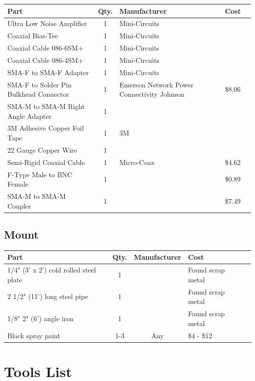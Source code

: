 \documentclass[11pt]{article} %
\begin{document}
\begin{tabular}{| p{6cm} | c | p{5cm} | l | c |}
\hline
\textbf{Part} & \textbf{Qty.} & \textbf{Manufacturer} & \textbf{Cost} \\ \hline \hline
Ultra Low Noise Amplifier & 1 & Mini-Circuits & \\ \hline
Coaxial Bias-Tee & 1 & Mini-Circuits & \\ \hline
Coaxial Cable 086-6SM+ & 1 & Mini-Circuits & \\ \hline
Coaxial Cable 086-4SM+ & 1 & Mini-Circuits & \\ \hline
SMA-F to SMA-F Adapter & 1 & Mini-Circuits & \\ \hline
SMA-F to Solder Pin Bulkhead Connector & 1 & Emerson Network Power Connectivity Johnson & \$8.06 \\ \hline
SMA-M to SMA-M Right Angle Adapter & 1 & & \\ \hline
3M Adhesive Copper Foil Tape & 1 & 3M & \\ \hline
22 Gauge Copper Wire & 1 & & \\ \hline
Semi-Rigid Coaxial Cable & 1 & Micro-Coax & \$4.62 \\ \hline
F-Type Male to BNC Female & 1 & & \$0.89 \\ \hline
SMA-M to SMA-M Coupler & 1 & & \$7.49\\ \hline
\end{tabular}


\subsection{Mount}

\begin{tabular}{| p{6cm} | c | c | l | c |}
\hline
\textbf{Part} & \textbf{Qty.} & \textbf{Manufacturer} & \textbf{Cost} \\ \hline \hline
1/4" (3' x 2') cold rolled steel plate & 1 & & Found scrap metal \\ \hline	
2 1/2" (11') long steel pipe & 1 & &  Found scrap metal \\ \hline
1/8" 2" (6') angle iron	 & 1 & &  Found scrap metal \\ \hline
Black spray paint & 1-3 & Any & \$4 - \$12 \\ \hline
\end{tabular}


\newpage

\section{Tools List}
\end{document}
